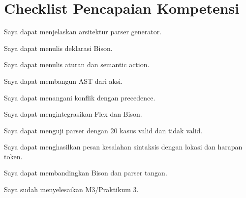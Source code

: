 \section*{Checklist Pencapaian Kompetensi}

\begin{checklist}
  \item Saya dapat menjelaskan arsitektur parser generator.
  \item Saya dapat menulis deklarasi Bison.
  \item Saya dapat menulis aturan dan semantic action.
  \item Saya dapat membangun AST dari aksi.
  \item Saya dapat menangani konflik dengan precedence.
  \item Saya dapat mengintegrasikan Flex dan Bison.
  \item Saya dapat menguji parser dengan 20 kasus valid dan tidak
        valid.
  \item Saya dapat menghasilkan pesan kesalahan sintaksis dengan
        lokasi dan harapan token.
  \item Saya dapat membandingkan Bison dan parser tangan.
  \item Saya sudah menyelesaikan M3/Praktikum 3.
\end{checklist}
